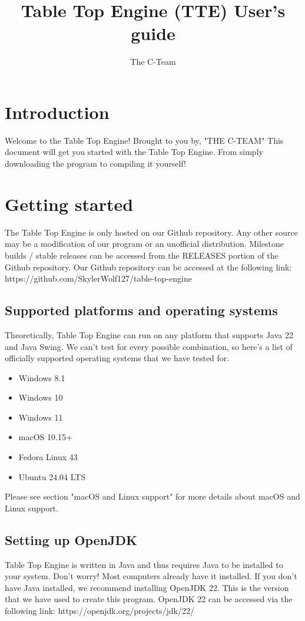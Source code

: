\documentclass{article}
\title{Table Top Engine (TTE) User's guide}
\author{The C-Team}
\begin{document}
\maketitle

\newpage
\section{Introduction}
Welcome to the Table Top Engine! Brought to you by, "THE C-TEAM" \break
This document will get you started with the Table Top Engine. From simply downloading the program to compiling it yourself! 
\newpage
\section{Getting started}
The Table Top Engine is only hosted on our Github repository. Any other source may be a modification of our program or an unofficial distribution. Milestone builds / stable releases can be accessed from the RELEASES portion of the Github repository. Our Github repository can be accessed at the following link: https://github.com/SkylerWolf127/table-top-engine \break
\subsection{Supported platforms and operating systems}
Theoretically, Table Top Engine can run on any platform that supports Java 22 and Java Swing. We can't test for every possible combination, so here's a list of officially supported operating systems that we have tested for. 
\begin{itemize}
    \item Windows 8.1
    \item Windows 10
    \item Windows 11
    \item macOS 10.15+
    \item Fedora Linux 43
    \item Ubuntu 24.04 LTS
\end{itemize}
Please see section "macOS and Linux support" for more details about macOS and Linux support.
    


\subsection{Setting up OpenJDK}
Table Top Engine is written in Java and thus requires Java to be installed to your system. Don't worry! Most computers already have it installed. If you don't have Java installed, we recommend installing OpenJDK 22. This is the version that we have used to create this program. OpenJDK 22 can be accessed via the following link: https://openjdk.org/projects/jdk/22/
\end{document}
